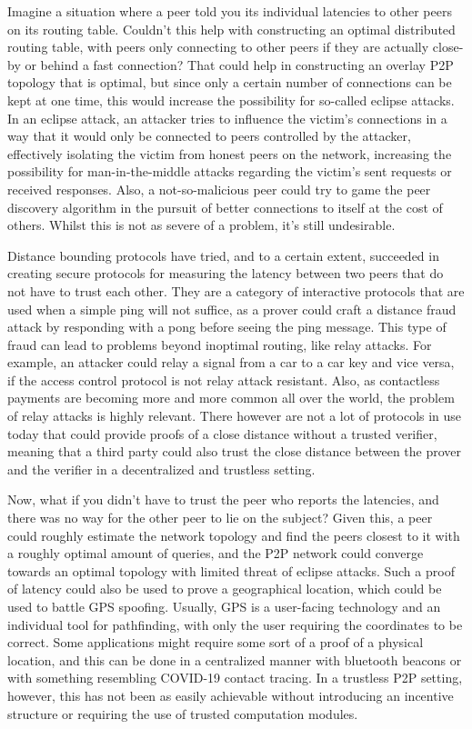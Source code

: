 Imagine a situation where a peer told you its individual latencies to other peers on its routing table. Couldn't this help with constructing an optimal distributed routing table, with peers only connecting to other peers if they are actually close-by or behind a fast connection? That could help in constructing an overlay P2P topology that is optimal, but since only a certain number of connections can be kept at one time, this would increase the possibility for so-called eclipse attacks. In an eclipse attack, an attacker tries to influence the victim's connections in a way that it would only be connected to peers controlled by the attacker, effectively isolating the victim from honest peers on the network, increasing the possibility for man-in-the-middle attacks regarding the victim's sent requests or received responses. Also, a not-so-malicious peer could try to game the peer discovery algorithm in the pursuit of better connections to itself at the cost of others. Whilst this is not as severe of a problem, it's still undesirable.

Distance bounding protocols have tried, and to a certain extent, succeeded in creating secure protocols for measuring the latency between two peers that do not have to trust each other. They are a category of interactive protocols that are used when a simple ping will not suffice, as a prover could craft a distance fraud attack by responding with a pong before seeing the ping message. This type of fraud can lead to problems beyond inoptimal routing, like relay attacks. For example, an attacker could relay a signal from a car to a car key and vice versa, if the access control protocol is not relay attack resistant. Also, as contactless payments are becoming more and more common all over the world, the problem of relay attacks is highly relevant. There however are not a lot of protocols in use today that could provide proofs of a close distance without a trusted verifier, meaning that a third party could also trust the close distance between the prover and the verifier in a decentralized and trustless setting.\cite{Maram_undated-it}

Now, what if you didn't have to trust the peer who reports the latencies, and there was no way for the other peer to lie on the subject? Given this, a peer could roughly estimate the network topology and find the peers closest to it with a roughly optimal amount of queries, and the P2P network could converge towards an optimal topology with limited threat of eclipse attacks. Such a proof of latency could also be used to prove a geographical location, which could be used to battle GPS spoofing. Usually, GPS is a user-facing technology and an individual tool for pathfinding, with only the user requiring the coordinates to be correct. Some applications might require some sort of a proof of a physical location, and this can be done in a centralized manner with bluetooth beacons or with something resembling COVID-19 contact tracing. In a trustless P2P setting, however, this has not been as easily achievable without introducing an incentive structure or requiring the use of trusted computation modules.

